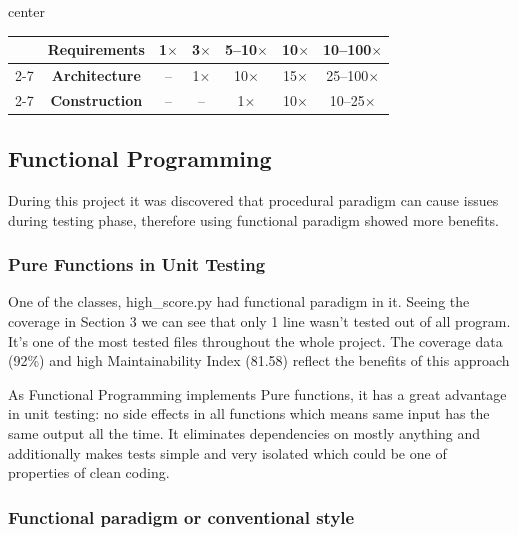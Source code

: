 \documentclass{article}
\begin{document}
\begin{table}[h]
\begin{adjustbox}{center}
\begin{tabular}{|c|c|c|c|c|c|c|}
             & \textbf{Requirements} & 1$\times$                              & 3$\times$                              & 5--10$\times$                          & 10$\times$                            & 10--100$\times$                        \\
            \cline{2-7} %
             & \textbf{Architecture} & --                                     & 1$\times$                              & 10$\times$                             & 15$\times$                            & 25--100$\times$                        \\
            \cline{2-7} %
             & \textbf{Construction} & --                                     & --                                     & 1$\times$                              & 10$\times$                            & 10--25$\times$                         \\
            \hline %
        \end{tabular}
    \end{adjustbox}
\end{table}

\subsection{Functional Programming}
During this project it was discovered that procedural paradigm can cause issues during testing phase, therefore using functional paradigm showed more benefits.

\subsubsection{Pure Functions in Unit Testing}
One of the classes, high\_score.py had functional paradigm in it. Seeing the coverage in Section 3 we can see that only 1 line wasn't tested out of all program. It's one of the most tested files throughout the whole project. The coverage data
(92\%) and high Maintainability Index (81.58) reflect the benefits of this approach

As Functional Programming implements Pure functions, it has a great advantage in unit testing: no side effects in all functions which means same input has the same output all the time. It eliminates dependencies on mostly anything and additionally makes tests simple and very isolated which could be one of properties of clean coding.

\subsubsection{Functional paradigm or conventional style}
\end{document}
